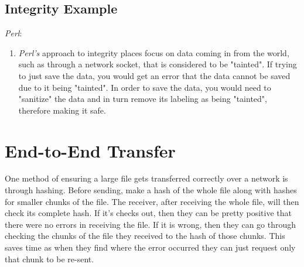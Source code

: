 \documentclass[twoside]{article}
\begin{document}
\subsection{Integrity Example}

\textit{Perl}:
\begin{enumerate}
    \item \textit{Perl's} approach to integrity places focus on data coming in from the world, such as through a network socket, that is considered to be "tainted". If trying to just save the data, you would get an error that the data cannot be saved due to it being "tainted". In order to save the data, you would need to "sanitize" the data and in turn remove its labeling as being "tainted", therefore making it safe.
\end{enumerate}


\section{End-to-End Transfer}
One method of ensuring a large file gets transferred correctly over a network is through hashing. Before sending, make a hash of the whole file along with hashes for smaller chunks of the file. The receiver, after receiving the whole file, will then check its complete hash. If it's checks out, then they can be pretty positive that there were no errors in receiving the file. If it is wrong, then they can go through checking the chunks of the file they received to the hash of those chunks. This saves time as when they find where the error occurred they can just request only that chunk to be re-sent.
\end{document}
